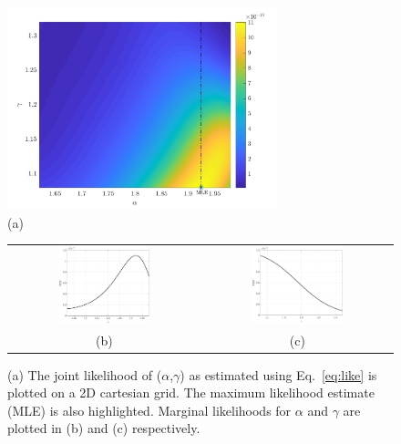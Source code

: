 \begin{figure}[htbp]
 \begin{center}
  \includegraphics[width=0.70\textwidth]{./Figures/gl}
  \\ (a)
  \begin{tabular}{cc}
  \includegraphics[width=0.50\textwidth]{./Figures/pdf_alpha}
  &
  \includegraphics[width=0.50\textwidth]{./Figures/pdf_gamma}
  \\ (b) & (c)
  \end{tabular}
\caption{(a) The joint likelihood of ($\alpha$,$\gamma$) as estimated using Eq.~\ref{eq:like} is plotted
on a 2D cartesian grid. The maximum likelihood estimate (MLE) is also highlighted.
Marginal likelihoods for $\alpha$ and $\gamma$ are plotted in (b) and (c) respectively.}
\label{fig:like}
\end{center}
\end{figure}


